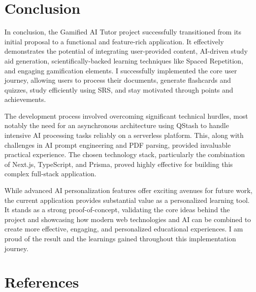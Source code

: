 \documentclass[
	letterpaper,
	11pt
]{jdf}
\begin{document}
\section{Conclusion}

In conclusion, the Gamified AI Tutor project successfully transitioned from its initial proposal to a functional and feature-rich application. It effectively demonstrates the potential of integrating user-provided content, AI-driven study aid generation, scientifically-backed learning techniques like Spaced Repetition, and engaging gamification elements. I successfully implemented the core user journey, allowing users to process their documents, generate flashcards and quizzes, study efficiently using SRS, and stay motivated through points and achievements.

The development process involved overcoming significant technical hurdles, most notably the need for an asynchronous architecture using QStash to handle intensive AI processing tasks reliably on a serverless platform. This, along with challenges in AI prompt engineering and PDF parsing, provided invaluable practical experience. The chosen technology stack, particularly the combination of Next.js, TypeScript, and Prisma, proved highly effective for building this complex full-stack application.

While advanced AI personalization features offer exciting avenues for future work, the current application provides substantial value as a personalized learning tool. It stands as a strong proof-of-concept, validating the core ideas behind the project and showcasing how modern web technologies and AI can be combined to create more effective, engaging, and personalized educational experiences. I am proud of the result and the learnings gained throughout this implementation journey.

\newpage
\section*{References}
\printbibliography[heading=none]
\end{document}

